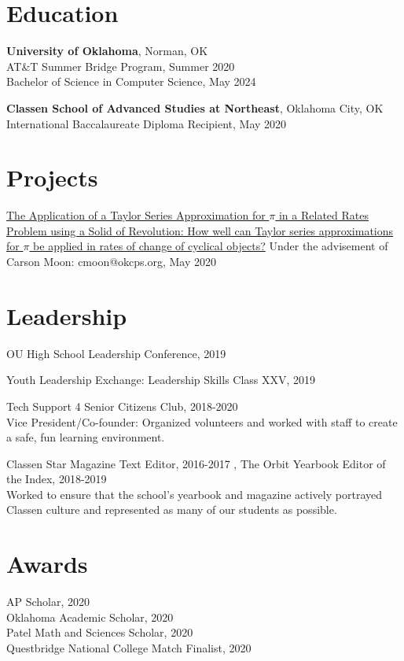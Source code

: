 \documentclass[12pt]{article}
\begin{document}
\section*{Education}
\textbf{University of Oklahoma}, Norman, OK \\
AT\&T Summer Bridge Program, Summer 2020 \\
Bachelor of Science in Computer Science, May 2024

\textbf{Classen School of Advanced Studies at Northeast}, Oklahoma City, OK \\
International Baccalaureate Diploma Recipient, May 2020

\section*{Projects}
\href{https://github.com/tttnguyen729/ee}{The Application of a Taylor Series Approximation for \(\pi\) in a Related Rates Problem using a Solid of Revolution: How well can Taylor series approximations for \(\pi\) be applied in rates of change of cyclical objects?} Under the advisement of Carson Moon: cmoon@okcps.org, May 2020 

\section*{Leadership}
OU High School Leadership Conference, 2019

Youth Leadership Exchange: Leadership Skills Class XXV, 2019 

Tech Support 4 Senior Citizens Club, 2018-2020 \\
Vice President/Co-founder: Organized volunteers and worked with staff to create a safe, fun learning environment.

Classen Star Magazine Text Editor, 2016-2017 , The Orbit Yearbook Editor of the Index, 2018-2019 \\
Worked to ensure that the school's yearbook and magazine actively portrayed Classen culture and represented as many of our students as possible.

\section*{Awards}
AP Scholar, 2020 \\
Oklahoma Academic Scholar, 2020 \\
Patel Math and Sciences Scholar, 2020 \\
Questbridge National College Match Finalist, 2020 
\end{document}
